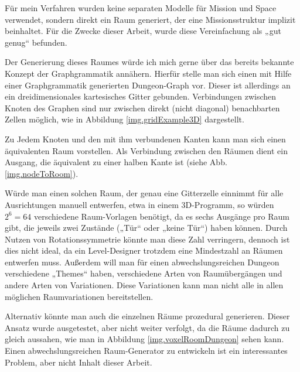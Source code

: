 Für mein Verfahren wurden keine separaten Modelle für Mission und Space verwendet, sondern direkt ein Raum generiert, der eine Missionsstruktur implizit beinhaltet. Für die Zwecke dieser Arbeit, wurde diese Vereinfachung als „gut genug“ befunden.

Der Generierung dieses Raumes würde ich mich gerne über das bereits bekannte Konzept der Graphgrammatik annähern. Hierfür stelle man sich einen mit Hilfe einer Graphgrammatik generierten Dungeon-Graph vor. Dieser ist allerdings an ein dreidimensionales kartesisches Gitter gebunden. Verbindungen zwischen Knoten des Graphen sind nur zwischen direkt (nicht diagonal) benachbarten Zellen möglich, wie in Abbildung \ref{img.gridExample3D} dargestellt.


Zu Jedem Knoten und den mit ihm verbundenen Kanten kann man sich einen äquivalenten Raum vorstellen. Als Verbindung zwischen den Räumen dient ein Ausgang, die äquivalent zu einer halben Kante ist (siehe Abb. \ref{img.nodeToRoom}).


Würde man einen solchen Raum, der genau eine Gitterzelle einnimmt für alle Ausrichtungen manuell entwerfen, etwa in einem 3D-Programm, so würden $ 2^6 = 64 $ verschiedene Raum-Vorlagen benötigt, da es sechs Ausgänge pro Raum gibt, die jeweils zwei Zustände („Tür“ oder „keine Tür“) haben können. Durch Nutzen von Rotationssymmetrie könnte man diese Zahl verringern, dennoch ist dies nicht ideal, da ein Level-Designer trotzdem eine Mindestzahl an Räumen entwerfen muss. Außerdem will man für einen abwechslungsreichen Dungeon verschiedene „Themes“ haben, verschiedene Arten von Raumübergängen und andere Arten von Variationen. Diese Variationen kann man nicht alle in allen möglichen Raumvariationen bereitstellen. 

Alternativ könnte man auch die einzelnen Räume prozedural generieren. Dieser Ansatz wurde ausgetestet, aber nicht weiter verfolgt, da die Räume dadurch zu gleich aussahen, wie man in Abbildung \ref{img.voxelRoomDungeon} sehen kann. Einen abwechslungsreichen Raum-Generator zu entwickeln ist ein interessantes Problem, aber nicht Inhalt dieser Arbeit.


